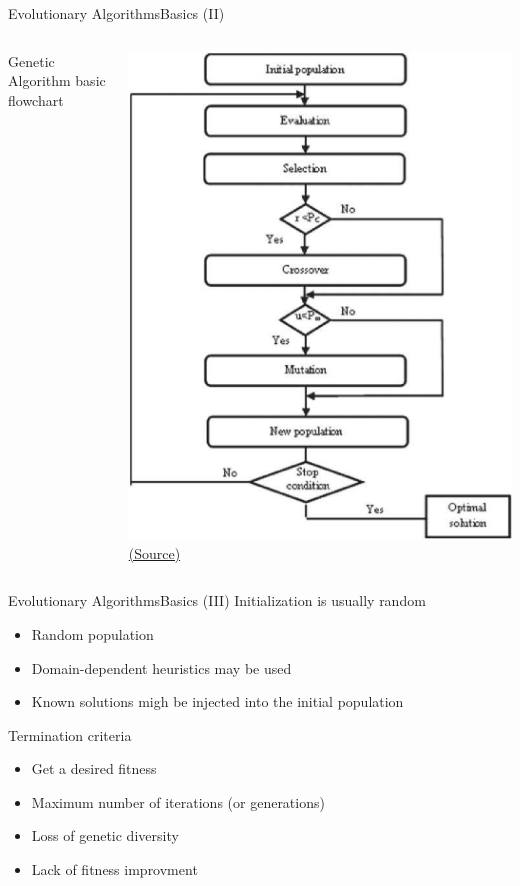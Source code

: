 \documentclass[10pt,compress]{beamer} %
\begin{document}
\begin{frame}{Evolutionary Algorithms}{Basics (II)} 
    \begin{columns}
		\begin{center}
		Genetic Algorithm basic flowchart
		\end{center}
		\includegraphics[width=0.9\linewidth]{figs/flow.png}\\
		\tiny{\href{https://www.researchgate.net/figure/The-Genetic-Algorithm-flowchart_fig1_339515126}{(Source)}}\\
    \end{columns}
\end{frame}

\begin{frame}{Evolutionary Algorithms}{Basics (III)}
	Initialization is usually random
	\begin{itemize}
		\item Random population
		\item Domain-dependent heuristics may be used
		\item Known solutions migh be injected into the initial population
	\end{itemize}
	Termination criteria
	\begin{itemize}
		\item Get a desired fitness
		\item Maximum number of iterations (or generations)
		\item Loss of genetic diversity
		\item Lack of fitness improvment
	\end{itemize}
\end{frame}
\end{document}
